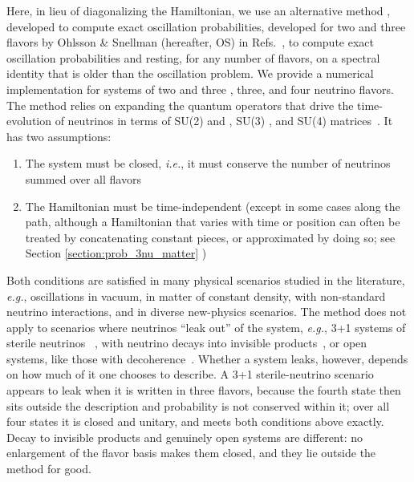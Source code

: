 \documentclass[final,5p,times,twocolumn]{elsarticle}
\newcommand{\ie}{{\it i.e.}}
\newcommand{\eg}{{\it e.g.}}
\newcommand{\Refs}{Refs.}
\providecommand{\DIFaddtex}[1]{{\protect\color{blue} \sf #1}} %
\providecommand{\DIFdeltex}[1]{{\protect\color{red} \scriptsize #1}} %
\providecommand{\DIFaddbegin}{} %
\providecommand{\DIFaddend}{} %
\providecommand{\DIFdelbegin}{} %
\providecommand{\DIFdelend}{} %
\providecommand{\DIFadd}[1]{\DIFaddtex{#1}} %
\providecommand{\DIFdel}[1]{\DIFdeltex{#1}} %
\begin{document}
Here, in lieu of diagonalizing the Hamiltonian, we use an alternative method \DIFdelbegin \DIFdel{, developed }\DIFdelend \DIFaddbegin \DIFadd{to compute exact oscillation probabilities, developed for two and three flavors }\DIFaddend by Ohlsson \& Snellman (hereafter, OS) in \Refs\ \cite{Ohlsson:1999xb, Ohlsson:1999um, Ohlsson:2000zz, Ohlsson:2001et}, \DIFdelbegin \DIFdel{to compute exact oscillation probabilities}\DIFdelend \DIFaddbegin \DIFadd{and resting, for any number of flavors, on a spectral identity that is older than the oscillation problem}\DIFaddend .  We provide a numerical implementation for systems of two\DIFdelbegin \DIFdel{and three}\DIFdelend \DIFaddbegin \DIFadd{, three, and four }\DIFaddend neutrino flavors.  The method relies on expanding the quantum operators that drive the time-evolution of neutrinos in terms of SU(2)\DIFdelbegin \DIFdel{and }\DIFdelend \DIFaddbegin \DIFadd{, }\DIFaddend SU(3)\DIFaddbegin \DIFadd{, and SU(4) }\DIFaddend matrices\ \cite{Ohlsson:1999xb, Ohlsson:1999um, Ohlsson:2000zz, Ohlsson:2001et}.  It has two assumptions:
\begin{enumerate}
 \item 
  The system must be closed, \ie, it must conserve the number of neutrinos summed over all flavors
 \item
  The Hamiltonian must be time-independent \DIFdelbegin \DIFdel{(except in some cases}\DIFdelend \DIFaddbegin \DIFadd{along the path, although a Hamiltonian that varies with time or position can often be treated by concatenating constant pieces, or approximated by doing so}\DIFaddend ; see Section \ref{section:prob_3nu_matter}
\DIFdelbegin \DIFdel{)
}\DIFdelend \end{enumerate}
Both conditions are satisfied in many physical scenarios studied in the literature, \eg, oscillations in vacuum, in matter of constant density, with non-standard neutrino interactions, and in diverse new-physics scenarios.  The method does not apply to scenarios where neutrinos ``leak out'' of the system, \eg,  \DIFdelbegin \DIFdel{3+1 systems of sterile neutrinos\ }%
\DIFdel{, }\DIFdelend with neutrino decays into invisible products\ \cite{Joshipura:2002fb, Beacom:2002cb, Beacom:2002vi, GonzalezGarcia:2008ru, Baerwald:2012kc, Berryman:2014yoa}, or open systems, like those with decoherence\ \cite{Benatti:2000ph, Lisi:2000zt, Ohlsson:2000mj, Carpio:2017nui, Coloma:2018idr}.  \DIFaddbegin \DIFadd{Whether a system leaks, however, depends on how much of it one chooses to describe.  A 3+1 sterile-neutrino scenario\ }\cite{Abazajian:2012ys, Palazzo:2013me, Gariazzo:2015rra, Dentler:2018sju, Giunti:2019aiy} \DIFadd{appears to leak when it is written in three flavors, because the fourth state then sits outside the description and probability is not conserved within it; over all four states it is closed and unitary, and meets both conditions above exactly.  Decay to invisible products and genuinely open systems are different: no enlargement of the flavor basis makes them closed, and they lie outside the method for good.
}\DIFaddend 
\end{document}

